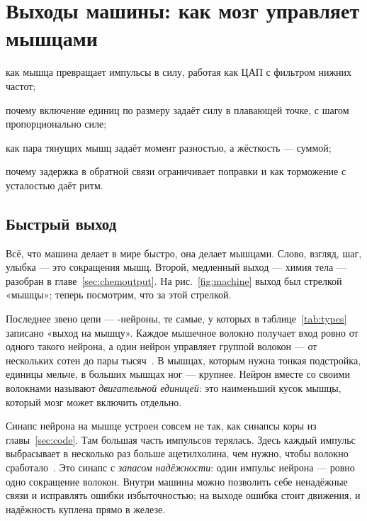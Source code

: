 \chapter{Выходы машины: как мозг управляет мышцами}
\label{sec:muscles}
\begin{chaptergoals}
\item как мышца превращает импульсы в силу, работая как ЦАП с фильтром нижних частот;
\item почему включение единиц по размеру задаёт силу в плавающей точке, с шагом пропорционально силе;
\item как пара тянущих мышц задаёт момент разностью, а жёсткость --- суммой;
\item почему задержка в обратной связи ограничивает поправки и как торможение с усталостью даёт ритм.
\end{chaptergoals}

\section{Быстрый выход}

Всё, что машина делает в мире быстро, она делает мышцами. Слово, взгляд, шаг, улыбка --- это сокращения мышц. Второй, медленный выход --- химия тела --- разобран в главе~\ref{sec:chemoutput}. На рис.~\ref{fig:machine} выход был стрелкой «мышцы»; теперь посмотрим, что за этой стрелкой.

Последнее звено цепи --- -нейроны, те самые, у которых в таблице~\ref{tab:types} записано «выход на мышцу». Каждое мышечное волокно получает вход ровно от одного такого нейрона, а один нейрон управляет группой волокон --- от нескольких сотен до пары тысяч~\cite{Feinstein1955mu}. В мышцах, которым нужна тонкая подстройка, единицы мельче, в больших мышцах ног --- крупнее. Нейрон вместе со своими волокнами называют \emph{двигательной единицей}: это наименьший кусок мышцы, который мозг может включить отдельно.

Синапс нейрона на мышце устроен совсем не так, как синапсы коры из главы~\ref{sec:code}. Там большая часть импульсов терялась. Здесь каждый импульс выбрасывает в несколько раз больше ацетилхолина, чем нужно, чтобы волокно сработало~\cite{WoodSlater2001}. Это синапс с \emph{запасом надёжности}: один импульс нейрона --- ровно одно сокращение волокон. Внутри машины можно позволить себе ненадёжные связи и исправлять ошибки избыточностью; на выходе ошибка стоит движения, и надёжность куплена прямо в железе.

